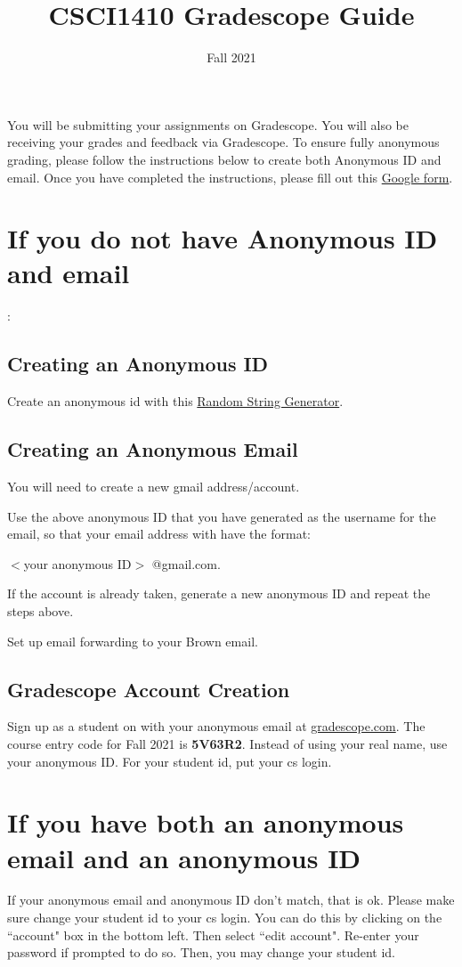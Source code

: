 \documentclass{article}
\title{CSCI1410 Gradescope Guide}
\author{}
\date{Fall 2021}
\begin{document}
\maketitle

You will be submitting your assignments on Gradescope. You will also be receiving your grades and feedback via Gradescope. To ensure fully anonymous grading, please follow the instructions below to create both Anonymous ID and email. Once you have completed the instructions, please fill out this \href{https://forms.gle/qT559KRsZLyHWGBe8}{Google form}. 

\section{If you do not have Anonymous ID and email}: 
\subsection{Creating an Anonymous ID}
Create an anonymous id with this \href {http://www.unit-conversion.info/texttools/random-string-generator/}{Random String Generator}.

\subsection{Creating an Anonymous Email}
You will need to create a new gmail address/account. 

Use the above anonymous ID that you have generated as the username for the email, so that your email address with have the format:

$<$your anonymous ID$>$ @gmail.com.

If the account is already taken, generate a new anonymous ID and repeat the steps above. 

Set up email forwarding to your Brown email. 

\subsection{Gradescope Account Creation}

Sign up as a student on with your anonymous email at \href{https://www.gradescope.com/}{gradescope.com}.
The course entry code for Fall 2021 is \textbf{5V63R2}.
Instead of using your real name, use your anonymous ID.
For your student id, put your cs login.

\section{If you have both an anonymous email and an anonymous ID}
If your anonymous email and anonymous ID don't match, that is ok. Please make sure change your student id to your cs login. You can do this by clicking on the ``account" box in the bottom left.
Then select ``edit account".
Re-enter your password if prompted to do so. Then, you may change your student id. 
\end{document}
